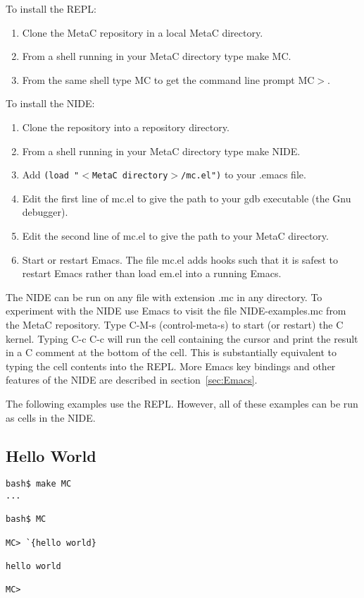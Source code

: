 \documentclass{article}
\begin{document}
\noindent To install the REPL:

\begin{enumerate}
\item Clone the MetaC repository in a local MetaC directory.
\item From a shell running in your MetaC directory type make MC.
\item From the same shell type MC to get the command line prompt MC$>$.
\end{enumerate}

\noindent To install the NIDE:

\begin{enumerate}
\item Clone the repository into a repository directory.
\item From a shell running in your MetaC directory type make NIDE.
\item Add {\tt (load "$<$MetaC directory$>$/mc.el")} to your .emacs file.
\item Edit the first line of  mc.el to give the path to your gdb executable (the Gnu debugger).
\item Edit the second line of mc.el to give the path to your MetaC directory.
\item Start or restart Emacs. The file mc.el adds hooks such that it is safest to restart Emacs rather than load em.el into a running Emacs.
\end{enumerate}

\noindent The NIDE can be run on any file with extension .mc in any directory.  To experiment with the NIDE use Emacs to visit the file NIDE-examples.mc from the MetaC repository.  
Type C-M-s (control-meta-s) to start (or restart) the C kernel. Typing C-c C-c will run the cell containing the cursor and print
the result in a C comment at the bottom of the cell.  This is substantially equivalent to typing the cell contents into the REPL.
More Emacs key bindings and other features of the NIDE are described in section~\ref{sec:Emacs}.

\medskip
\noindent The following examples use the REPL.  However, all of these examples can be run as cells in the NIDE.

\subsection{Hello World}
\label{sec:hello}

\begin{verbatim}
bash$ make MC
...

bash$ MC

MC> `{hello world}

hello world

MC>
\end{verbatim}
\end{document}
